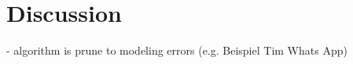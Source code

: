 \section{Discussion}
\label{text:experiments/discussion}

- algorithm is prune to modeling errors (e.g. Beispiel Tim Whats App)